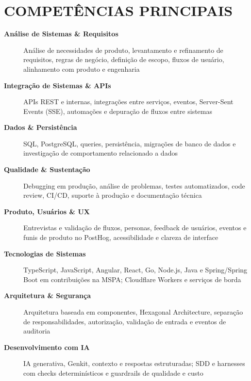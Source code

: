 \documentclass[10pt,a4paper]{article}
\begin{document}
\section*{COMPETÊNCIAS PRINCIPAIS}

\footnotesize

\begin{description}
    \item[\textbf{Análise de Sistemas \& Requisitos}]
    Análise de necessidades de produto, levantamento e refinamento de requisitos, regras de negócio, definição de escopo, fluxos de usuário, alinhamento com produto e engenharia

    \item[\textbf{Integração de Sistemas \& APIs}]
    APIs REST e internas, integrações entre serviços, eventos, Server-Sent Events (SSE), automações e depuração de fluxos entre sistemas

    \item[\textbf{Dados \& Persistência}]
    SQL, PostgreSQL, queries, persistência, migrações de banco de dados e investigação de comportamento relacionado a dados

    \item[\textbf{Qualidade \& Sustentação}]
    Debugging em produção, análise de problemas, testes automatizados, code review, CI/CD, suporte à produção e documentação técnica

    \item[\textbf{Produto, Usuários \& UX}]
    Entrevistas e validação de fluxos, personas, feedback de usuários, eventos e funis de produto no PostHog, acessibilidade e clareza de interface

    \item[\textbf{Tecnologias de Sistemas}]
    TypeScript, JavaScript, Angular, React, Go, Node.js, Java e Spring/Spring Boot em contribuições na MSPA; Cloudflare Workers e serviços de borda

    \item[\textbf{Arquitetura \& Segurança}]
    Arquitetura baseada em componentes, Hexagonal Architecture, separação de responsabilidades, autorização, validação de entrada e eventos de auditoria

    \item[\textbf{Desenvolvimento com IA}]
    IA generativa, Genkit, contexto e respostas estruturadas; SDD e harnesses com checks determinísticos e guardrails de qualidade e custo
\end{description}

\end{document}
